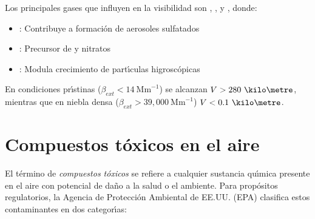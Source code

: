 Los principales gases que influyen en la visibilidad son , , y , donde:
\begin{itemize}
    \item {}: Contribuye a formaci\'on de aerosoles sulfatados
    \item {}: Precursor de  y nitratos
    \item {}: Modula crecimiento de part\'{\i}culas higrosc\'opicas
\end{itemize}

En condiciones pr\'{\i}stinas ($\beta_{ext} < 14\ \text{Mm}^{-1}$) se alcanzan $V > 280\ \kilo\metre$, mientras que en niebla densa ($\beta_{ext} > 39,000\ \text{Mm}^{-1}$) $V < 0.1\ \kilo\metre$.

\section{Compuestos t\'oxicos en el aire}
\label{ctox}
\normalsize
El t\'ermino de \emph{compuestos t\'oxicos} se refiere a cualquier sustancia qu\'{\i}mica presente en el aire con potencial de da\~no a la salud o el ambiente. Para prop\'ositos regulatorios, la Agencia de Protecci\'on Ambiental de EE.UU. (EPA) clasifica estos contaminantes en dos categor\'{\i}as:

